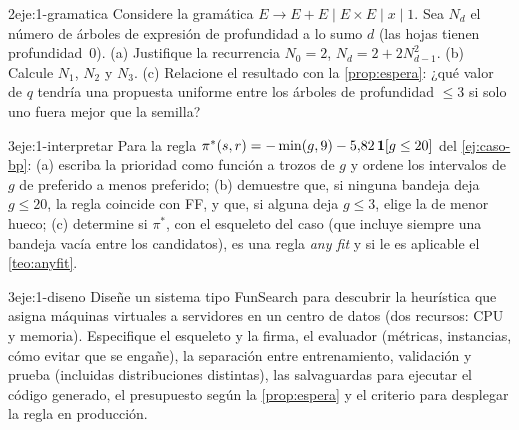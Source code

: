 \begin{ejercicio}{2}{eje:1-gramatica}
Considere la gramática $E\to E+E\mid E\times E\mid x\mid 1$. Sea $N_d$ el número de árboles de expresión de profundidad a lo sumo $d$ (las hojas tienen profundidad~0). (a) Justifique la recurrencia $N_0=2$, $N_d=2+2N_{d-1}^{2}$. (b) Calcule $N_1$, $N_2$ y $N_3$. (c) Relacione el resultado con la \cref{prop:espera}: ¿qué valor de $q$ tendría una propuesta uniforme entre los árboles de profundidad $\le 3$ si solo uno fuera mejor que la semilla?
\end{ejercicio}

\begin{ejercicio}{3}{eje:1-interpretar}
Para la regla $\pi^{*}(s,r)=-\min(g,9)-5{,}82\,\mathbf{1}[g\le 20]$ del \cref{ej:caso-bp}: (a) escriba la prioridad como función a trozos de $g$ y ordene los intervalos de $g$ de preferido a menos preferido; (b) demuestre que, si ninguna bandeja deja $g\le 20$, la regla coincide con FF, y que, si alguna deja $g\le 3$, elige la de menor hueco; (c) determine si $\pi^{*}$, con el esqueleto del caso (que incluye siempre una bandeja vacía entre los candidatos), es una regla \emph{any fit} y si le es aplicable el \cref{teo:anyfit}.
\end{ejercicio}

\begin{ejercicio}{3}{eje:1-diseno}
Diseñe un sistema tipo FunSearch para descubrir la heurística que asigna máquinas virtuales a servidores en un centro de datos (dos recursos: CPU y memoria). Especifique el esqueleto y la firma, el evaluador (métricas, instancias, cómo evitar que se engañe), la separación entre entrenamiento, validación y prueba (incluidas distribuciones distintas), las salvaguardas para ejecutar el código generado, el presupuesto según la \cref{prop:espera} y el criterio para desplegar la regla en producción.
\end{ejercicio}
